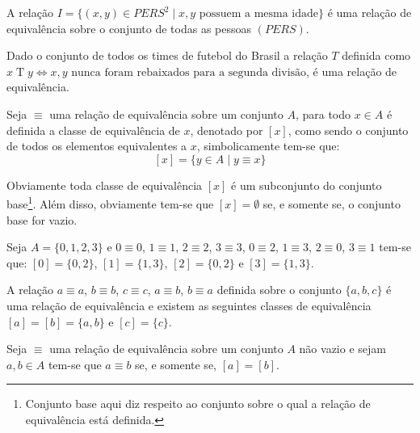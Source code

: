 \begin{example}
	A relação $I =  \{(x, y) \in PERS^2 \mid x, y \text{ possuem a mesma idade}\}$ é uma relação de equivalência sobre o conjunto de todas as pessoas $(PERS)$.
\end{example}

\begin{example}
	Dado o conjunto de todos os times de futebol do Brasil a relação $T$ definida como $x \mathrel{T} y \Longleftrightarrow x, y \text{ nunca foram rebaixados para a segunda divisão}$, é uma relação de equivalência.
\end{example}


\begin{definition}
	Seja $\equiv$ uma relação de equivalência sobre um conjunto $A$, para todo $x \in A$ é definida a classe de equivalência de $x$, denotado por $[x]$, como sendo o conjunto de todos os elementos equivalentes a $x$, simbolicamente tem-se que:
	$$[x] = \{y \in A \mid y \equiv x\}$$
\end{definition}

Obviamente toda classe de equivalência $[x]$ é um subconjunto do conjunto base\footnote{Conjunto base aqui diz respeito ao conjunto sobre o qual a relação de equivalência está definida.}. Além disso,  obviamente tem-se que $[x] = \emptyset$ se, e somente se, o conjunto base for vazio. 

\begin{example}\label{exe:ClasseEquivalencia1}
	Seja $A = \{0, 1, 2, 3\}$ e $0 \equiv 0$, $1 \equiv 1$, $2 \equiv 2$, $3 \equiv 3$, $0 \equiv 2$, $1 \equiv 3$, $2 \equiv 0$, $3 \equiv 1$ tem-se que: $[0] = \{0, 2\}$, $[1] = \{1, 3\}$, $[2] = \{0, 2\}$ e $[3] = \{1, 3\}$.
\end{example}

\begin{example}
	A relação $a \equiv a$, $b \equiv b$, $c \equiv c$, $a \equiv b$, $b \equiv a$ definida sobre o conjunto $\{a, b, c\}$ é uma relação de equivalência e existem as seguintes classes de equivalência $[a] = [b] = \{a, b\}$ e $[c] =\{c\}$.
\end{example}

\begin{theorem}\label{teo:EquivalenciaPropriedade1}
	Seja $\equiv$ uma relação de equivalência sobre um conjunto $A$ não vazio e sejam $a, b \in A$ tem-se que $a \equiv b$ se, e somente se, $[a] = [b]$.
\end{theorem}

